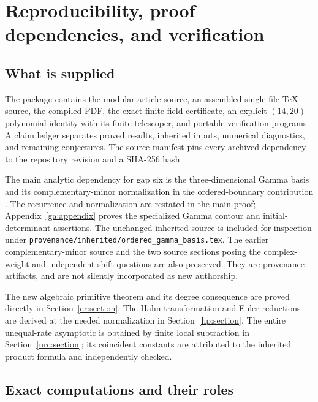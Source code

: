 \documentclass[11pt,a4paper]{article}
\theoremstyle{definition}
\theoremstyle{remark}
\numberwithin{equation}{section}
\begin{document}

\section{Reproducibility, proof dependencies, and verification}
\label{repro:section}

\subsection{What is supplied}

The package contains the modular article source, an assembled
single-file \TeX{} source, the compiled PDF, the exact
finite-field certificate, an explicit $(14,20)$ polynomial
identity with its finite telescoper, and portable verification
programs. A claim ledger separates proved results, inherited
inputs, numerical diagnostics, and remaining conjectures.
The source manifest pins every archived dependency to the
repository revision and a SHA-256 hash.

The main analytic dependency for gap six is the three-dimensional
Gamma basis and its complementary-minor normalization in the
ordered-boundary contribution \cite{OrderedIncoming}.
The recurrence and normalization are restated in the main proof;
Appendix~\ref{ga:appendix} proves the specialized Gamma contour
and initial-determinant assertions. The unchanged inherited source
is included for inspection under
\texttt{provenance/inherited/ordered\_gamma\_basis.tex}.
The earlier complementary-minor source
\cite{GapFourSource} and the two source sections posing the
complex-weight and independent-shift questions are also preserved.
They are provenance artifacts, and are not silently incorporated
as new authorship.

The new algebraic primitive theorem and its degree consequence
are proved directly in Section~\ref{cr:section}. The Hahn
transformation and Euler reductions are derived at the needed
normalization in Section~\ref{hp:section}. The entire unequal-rate
asymptotic is obtained by finite local subtraction in
Section~\ref{urc:section}; its coincident constants are attributed
to the inherited product formula and independently checked.

\subsection{Exact computations and their roles}
\end{document}
